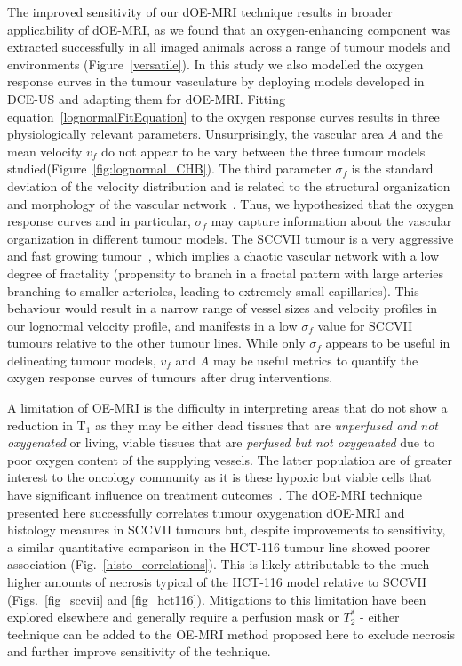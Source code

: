 The improved sensitivity of our \ac{dOE-MRI} technique results in broader applicability of \ac{dOE-MRI}, as we found that an oxygen-enhancing component was extracted successfully in all imaged animals across a range of tumour models and environments (Figure~\ref{versatile}).
In this study we also modelled the oxygen response curves in the tumour vasculature by deploying models developed in \ac{DCE-US} and adapting them for \ac{dOE-MRI}.
Fitting equation~\ref{lognormalFitEquation} to the oxygen response curves results in three physiologically relevant parameters.
Unsurprisingly, the vascular area $A$ and the mean velocity $v_f$ do not appear to be vary between the three tumour models studied(Figure~\ref{fig:lognormal_CHB}).
The third parameter $\sigma_f$ is the standard deviation of the velocity distribution and is related to the structural organization and morphology of the vascular network~\cite{Hudson:2009jv}.
Thus, we hypothesized that the oxygen response curves and in particular, $\sigma_f$ may capture information about the vascular organization in different tumour models.
The SCCVII tumour is a very aggressive and fast growing tumour~\cite{Khurana:2001wb}, which implies a chaotic vascular network with a low degree of fractality (propensity to branch in a fractal pattern with large arteries branching to smaller arterioles, leading to extremely small capillaries).
This behaviour would result in a narrow range of vessel sizes and velocity profiles in our lognormal velocity profile,  and manifests in a low $\sigma_f$ value for SCCVII tumours relative to the other tumour lines.
While only $\sigma_f$ appears to be useful in delineating tumour models, $v_f$ and $A$ may be useful metrics to quantify the oxygen response curves of tumours after drug interventions. 
  
A limitation of OE-MRI is the difficulty in interpreting areas that do not show a reduction in T$_1$ as they may be either dead tissues that are \textit{unperfused and not oxygenated} or living, viable tissues that are \textit{perfused but not oxygenated} due to poor oxygen content of the supplying vessels. 
The latter population are of greater interest to the oncology community as it is these hypoxic but viable cells that have significant influence on treatment outcomes~\cite{Horsman:2016go}. 
The \ac{dOE-MRI} technique presented here successfully correlates tumour oxygenation \ac{dOE-MRI} and histology measures in SCCVII tumours but, despite improvements to sensitivity, a similar quantitative comparison in the HCT-116 tumour line showed poorer association (Fig.~\ref{histo_correlations}). 
This is likely attributable to the much higher amounts of necrosis typical of the HCT-116 model relative to SCCVII (Figs.~\ref{fig_sccvii} and \ref{fig_hct116}).
Mitigations to this limitation have been explored elsewhere and generally require a perfusion mask or $T_2^*$ - either technique can be added to the OE-MRI method proposed here to exclude necrosis and further improve sensitivity of the technique.

